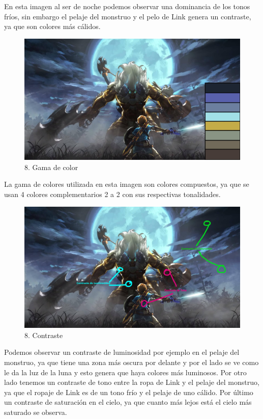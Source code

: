 \documentclass[12pt]{article}
\begin{document}
En esta imagen al ser de noche podemos observar una dominancia de los tonos fríos, sin embargo el pelaje del monstruo y el pelo de Link genera un contraste, ya que son colores más cálidos.

\begin{figure}[H]
      \centering
      \includegraphics[width=\textwidth]{images/Raúl/Sección 8/Imagen 8 colores.jpg}
      \caption{\small 8. Gama de color}
    \end{figure}

 La gama de colores utilizada en esta imagen son colores compuestos, ya que se usan 4 colores complementarios 2 a 2 con sus respectivas tonalidades.

\begin{figure}[H]
      \centering
      \includegraphics[width=\textwidth]{images/Raúl/Sección 8/Imagen 8 contraste.jpg}
      \caption{\small 8. Contraste}
    \end{figure}

Podemos observar un contraste de luminosidad por ejemplo en el pelaje del monstruo, ya que tiene una zona más oscura por delante y por el lado se ve como le da la luz de la luna y esto genera que haya colores más luminosos. Por otro lado tenemos un contraste de tono entre la ropa de Link y el pelaje del monstruo, ya que el ropaje de Link es de un tono frío y el pelaje de uno cálido. Por último un contraste de saturación en el cielo, ya que cuanto más lejos está el cielo más saturado se observa.
\end{document}
